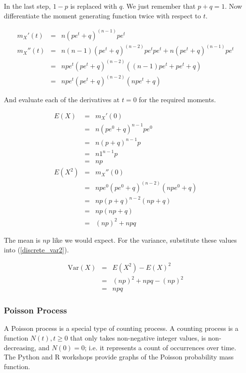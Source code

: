 \documentclass[]{article}
\begin{document}
In the last step, $1-p$ is replaced with $q$.  We just
remember that $p + q = 1$.  Now
differentiate the moment generating function twice with
respect to $t$.

\begin{eqnarray*}
m_X'(t) & = & n(pe^t + q)^{(n-1)} pe^t \\
m_X''(t) & = & n(n-1)(pe^t + q)^{(n-2)} pe^t pe^t +
          n(pe^t + q)^{(n-1)} pe^t \\
   & = & npe^t(pe^t + q)^{(n-2)}((n-1)pe^t + pe^t + q) \\
   & = & npe^t(pe^t + q)^{(n-2)}(npe^t + q)
\end{eqnarray*}

And evaluate each of the derivatives at $t=0$ for the
required moments.

\begin{eqnarray*}
E(X) & = & m_X'(0) \\
   & = & n(pe^0 + q)^{n-1} pe^0 \\
   & = & n(p+q)^{n-1}p \\
   & = & n1^{n-1}p \\
   & = & np  \\
E(X^2) & = & m_X''(0) \\
   & = & npe^0(pe^0 + q)^{(n-2)}(npe^0 + q) \\
   & = & np(p+q)^{n-2} (np + q) \\
   & = & np (np+q) \\
   & = & (np)^2 + npq
\end{eqnarray*}

The mean is $np$ like we would expect.  For the variance,
substitute these values into (\ref{discrete_var2}).

\begin{eqnarray}
\mbox{Var}(X) & = & E(X^2) - E(X)^2 \nonumber \\
   & = & (np)^2 + npq - (np)^2 \nonumber \\
   & = & npq \label{binomial_var}
\end{eqnarray}

\subsubsection{Poisson Process}
\label{subsec:poisson}

A Poisson process is a special type of counting process.
A counting process is a function $N(t), t \ge 0$ that
only takes non-negative integer values, is non-decreasing,
and $N(0)=0$;
i.e. it represents a count of occurrences over time.  The
Python and R workshops provide graphs of the Poisson
probability mass function.
\end{document}
